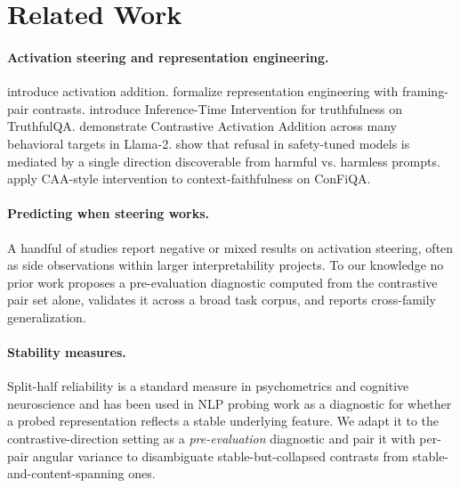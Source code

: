 \documentclass{article}
\begin{document}
\section{Related Work}

\paragraph{Activation steering and representation engineering.}
\citet{turner2023activation} introduce activation addition.
\citet{zou2023representation} formalize representation engineering
with framing-pair contrasts. \citet{li2023iti} introduce
Inference-Time Intervention for truthfulness on TruthfulQA.
\citet{rimsky2023steering} demonstrate Contrastive Activation
Addition across many behavioral targets in Llama-2.
\citet{arditi2024refusal} show that refusal in safety-tuned models
is mediated by a single direction discoverable from harmful vs.
harmless prompts. \citet{yang2026contextfocus} apply CAA-style
intervention to context-faithfulness on ConFiQA.

\paragraph{Predicting when steering works.}
A handful of studies report negative or mixed results on activation
steering, often as side observations within larger interpretability
projects. To our knowledge no prior work proposes a pre-evaluation
diagnostic computed from the contrastive pair set alone, validates it
across a broad task corpus, and reports cross-family generalization.

\paragraph{Stability measures.}
Split-half reliability is a standard measure in psychometrics and
cognitive neuroscience and has been used in NLP probing work as a
diagnostic for whether a probed representation reflects a stable
underlying feature. We adapt it to the contrastive-direction setting
as a \emph{pre-evaluation} diagnostic and pair it with per-pair
angular variance to disambiguate stable-but-collapsed contrasts from
stable-and-content-spanning ones.
\end{document}
